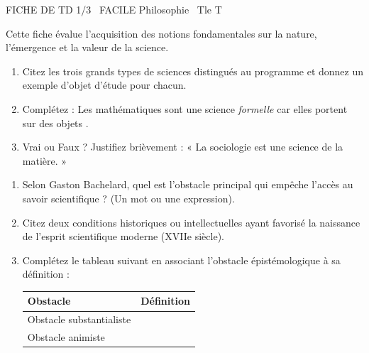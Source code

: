 \documentclass[11pt]{article}
\begin{document}
\begin{tcolorbox}[enhanced,colback=popink,colframe=popink,arc=10pt,boxrule=0pt,left=12pt,right=12pt,top=9pt,bottom=9pt]
{\color{white}\popxbold\small FICHE DE TD 1/3 \textbullet\ FACILE \hfill Philosophie \textbullet\ Tle T\par}
\end{tcolorbox}
\vspace{4pt}
Cette fiche évalue l'acquisition des notions fondamentales sur la nature, l'émergence et la valeur de la science.

\begin{exercice}
\begin{enumerate}
    \item Citez les trois grands types de sciences distingués au programme et donnez un exemple d'objet d'étude pour chacun.
    \item Complétez : Les mathématiques sont une science \textit{formelle} car elles portent sur des objets \underline{\hspace{4cm}}.
    \item Vrai ou Faux ? Justifiez brièvement : « La sociologie est une science de la matière. »
\end{enumerate}
\end{exercice}

\begin{exercice}
\begin{enumerate}
    \item Selon Gaston Bachelard, quel est l'obstacle principal qui empêche l'accès au savoir scientifique ? (Un mot ou une expression).
    \item Citez deux conditions historiques ou intellectuelles ayant favorisé la naissance de l'esprit scientifique moderne (XVIIe siècle).
    \item Complétez le tableau suivant en associant l'obstacle épistémologique à sa définition :
    \begin{tabular}{|p{3.5cm}|p{10cm}|}
    \hline
    \textbf{Obstacle} & \textbf{Définition} \\ \hline
    Obstacle substantialiste & \underline{\hspace{9.5cm}} \\ \hline
    Obstacle animiste & \underline{\hspace{9.5cm}} \\ \hline
    \end{tabular}
\end{enumerate}
\end{exercice}
\end{document}
